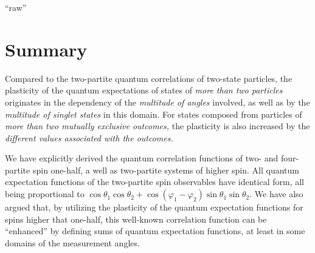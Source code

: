 \documentclass[pra,amsfonts,showpacs,showkeys,preprint]{revtex4}
\begin{document}
``raw''




\section{Summary}

Compared to the two-partite quantum correlations of two-state particles,
the plasticity of the quantum expectations of states of {\em more than  two particles }
originates in the dependency of the {\em multitude of angles} involved, as well as by the {\em multitude of singlet states} in this domain.
For states composed from particles of {\em more than two mutually exclusive outcomes,} the plasticity
is also increased by the {\em different values associated with the outcomes.}

We have explicitly derived the quantum correlation functions of two- and four-partite spin one-half, a well as two-partite systems of higher spin.
All quantum expectation functions of the two-partite spin observables have identical form, all being proportional to
$\cos \theta_1 \cos \theta_2 + \cos (\varphi_1 - \varphi_2) \sin \theta_1 \sin \theta_2$.
We have also argued that, by utilizing the plasticity of the quantum expectation functions for spins higher that one-half,
this well-known correlation function can be ``enhanced'' by defining sums of quantum expectation functions,
at least in some domains of the measurement angles.
\end{document}
